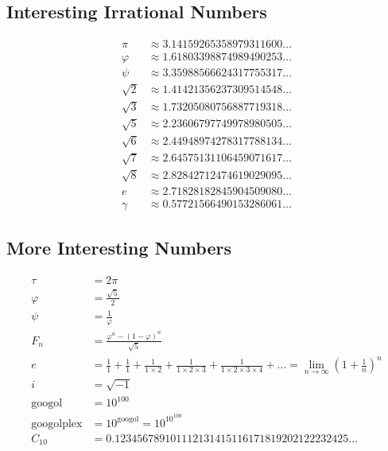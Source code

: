 \documentclass[12pt]{article}
\begin{document}
\subsection*{Interesting Irrational Numbers}
\begin{align*}
     \pi & \approx 3.14159 26535 89793 11600 \ldots \\
 \varphi & \approx 1.61803 39887 49894 90253 \ldots \\
    \psi & \approx 3.35988 56662 43177 55317 \ldots \\
\sqrt{2} & \approx 1.41421 35623 73095 14548 \ldots \\
\sqrt{3} & \approx 1.73205 08075 68877 19318 \ldots \\
\sqrt{5} & \approx 2.23606 79774 99789 80505 \ldots \\
\sqrt{6} & \approx 2.44948 97427 83177 88134 \ldots \\
\sqrt{7} & \approx 2.64575 13110 64590 71617 \ldots \\
\sqrt{8} & \approx 2.82842 71247 46190 29095 \ldots \\
       e & \approx 2.71828 18284 59045 09080 \ldots \\
  \gamma & \approx 0.57721 56649 01532 86061 \ldots
\end{align*}



\subsection*{More Interesting Numbers}
\begin{align*}
    \tau & = 2 \pi \\
 \varphi & = \frac{\sqrt{5}}{2} \\
    \psi & = \frac{1}{\varphi} \\
   F_{n} & = \frac{\varphi^{n}-(1-\varphi)^{n}}{\sqrt{5}} \\
       e & = \frac{1}{1} + \frac{1}{1} + \frac{1}{1 \times 2} + \frac{1}{1 \times 2 \times 3} + \frac{1}{1 \times 2 \times 3 \times 4} + \ldots 
         = \lim_{n\rightarrow\infty}\left(1+\frac{1}{n}\right)^{n} \\
       i & = \sqrt{-1}\\
\text{googol} 
         & = 10^{100} \\
\text{googolplex} 
         & = 10^{\text{googol}} = 10^{10^{100}} \\
C_{10}
         & = 0.123456789101112131415116171819202122232425\ldots \\
\end{align*}
\end{document}
